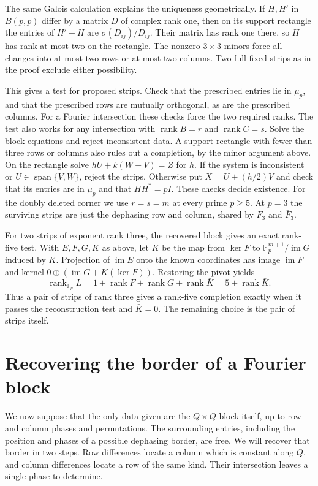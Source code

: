 \documentclass[11pt,a4paper]{article}
\numberwithin{equation}{section}
\begin{document}
The same Galois calculation explains the uniqueness geometrically. If $H,H'$ in $B(p,p)$ differ by a matrix $D$ of complex rank one, then on its support rectangle the entries of $H'+H$ are $\sigma(D_{ij})/D_{ij}$. Their matrix has rank one there, so $H$ has rank at most two on the rectangle. The nonzero $3\times3$ minors force all changes into at most two rows or at most two columns. Two full fixed strips as in the proof exclude either possibility.

This gives a test for proposed strips. Check that the prescribed entries lie in $\mu_p$, and that the prescribed rows are mutually orthogonal, as are the prescribed columns. For a Fourier intersection these checks force the two required ranks. The test also works for any intersection with $\operatorname{rank}B=r$ and $\operatorname{rank}C=s$. Solve the block equations and reject inconsistent data. A support rectangle with fewer than three rows or columns also rules out a completion, by the minor argument above. On the rectangle solve $hU+k(W-V)=Z$ for $h$. If the system is inconsistent or $U\in\operatorname{span}\{V,W\}$, reject the strips. Otherwise put $X=U+(h/2)V$ and check that its entries are in $\mu_p$ and that $HH^*=pI$. These checks decide existence. For the doubly deleted corner we use $r=s=m$ at every prime $p\ge5$. At $p=3$ the surviving strips are just the dephasing row and column, shared by $F_3$ and $\bar F_3$.

For two strips of exponent rank three, the recovered block gives an exact rank-five test. With $E,F,G,K$ as above, let $\bar K$ be the map from $\ker F$ to $\mathbb F_p^{m+1}/\operatorname{im}G$ induced by $K$. Projection of $\operatorname{im}E$ onto the known coordinates has image $\operatorname{im}F$ and kernel $0\oplus(\operatorname{im}G+K(\ker F))$. Restoring the pivot yields
$$\operatorname{rank}_{\mathbb F_p}L=1+\operatorname{rank}F+\operatorname{rank}G+\operatorname{rank}\bar K=5+\operatorname{rank}\bar K.$$
Thus a pair of strips of rank three gives a rank-five completion exactly when it passes the reconstruction test and $\bar K=0$. The remaining choice is the pair of strips itself.

\section{Recovering the border of a Fourier block}\label{sec:bare}

We now suppose that the only data given are the $Q\times Q$ block itself, up to row and column phases and permutations. The surrounding entries, including the position and phases of a possible dephasing border, are free. We will recover that border in two steps. Row differences locate a column which is constant along $Q$, and column differences locate a row of the same kind. Their intersection leaves a single phase to determine.
\end{document}
